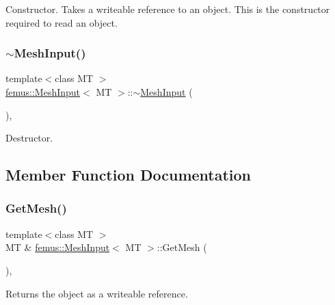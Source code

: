 Constructor. Takes a writeable reference to an object. This is the constructor required to read an object. \mbox{\label{classfemus_1_1_mesh_input_ad030535230e78c4a3e2b4bfd750d7a1a}} 
\subsubsection{\texorpdfstring{$\sim$\+Mesh\+Input()}{~MeshInput()}}
{\footnotesize\ttfamily template$<$class MT $>$ \\
\mbox{\hyperlink{classfemus_1_1_mesh_input}{femus\+::\+Mesh\+Input}}$<$ MT $>$\+::$\sim$\mbox{\hyperlink{classfemus_1_1_mesh_input}{Mesh\+Input}} (\begin{DoxyParamCaption}{ }\end{DoxyParamCaption})\hspace{0.3cm}{\ttfamily [inline]}, {\ttfamily [virtual]}}

Destructor. 

\subsection{Member Function Documentation}
\mbox{\label{classfemus_1_1_mesh_input_a51922fa488be9d1c647026714ce25bdb}} 
\subsubsection{\texorpdfstring{Get\+Mesh()}{GetMesh()}}
{\footnotesize\ttfamily template$<$class MT $>$ \\
MT \& \mbox{\hyperlink{classfemus_1_1_mesh_input}{femus\+::\+Mesh\+Input}}$<$ MT $>$\+::Get\+Mesh (\begin{DoxyParamCaption}{ }\end{DoxyParamCaption})\hspace{0.3cm}{\ttfamily [inline]}, {\ttfamily [protected]}}

Returns the object as a writeable reference. \mbox{\label{classfemus_1_1_mesh_input_abf3b91c5ef2cdcf99561ab7429101601}} 
